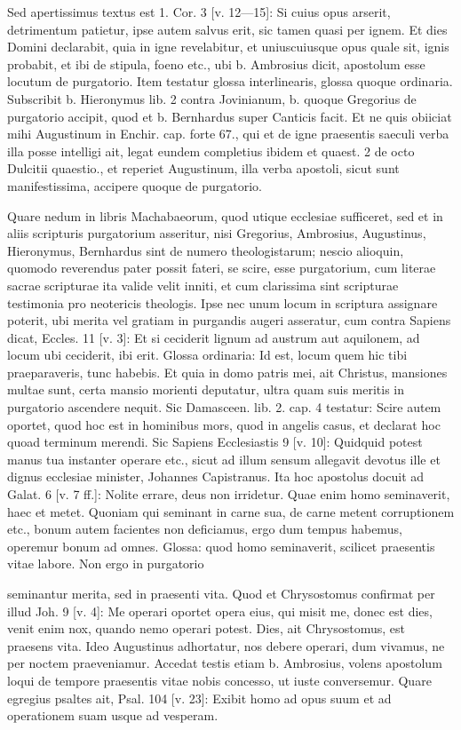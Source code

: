 Sed apertissimus textus est 1. Cor. 3 [v. 12—15]: Si cuius opus arserit, detrimentum patietur, ipse autem salvus erit, sic tamen quasi per ignem. Et dies Domini declarabit, quia in igne revelabitur, et uniuscuiusque opus quale sit, ignis probabit, et ibi de stipula, foeno etc., ubi b. Ambrosius dicit, apostolum esse locutum de purgatorio. Item testatur glossa interlinearis, glossa quoque ordinaria. Subscribit b. Hieronymus lib. 2 contra Jovinianum, b. quoque Gregorius de purgatorio accipit, quod et b. Bernhardus super Canticis facit. Et ne quis obiiciat mihi Augustinum in Enchir. cap. forte 67., qui et de igne praesentis saeculi verba illa posse intelligi ait, legat eundem completius ibidem et quaest. 2 de octo Dulcitii quaestio., et reperiet Augustinum, illa verba apostoli, sicut sunt manifestissima, accipere quoque de purgatorio.

\marginpar{\small[327]} Quare nedum in libris Machabaeorum, quod utique ecclesiae sufficeret, sed et in aliis scripturis purgatorium asseritur, nisi Gregorius, Ambrosius, Augustinus, Hieronymus, Bernhardus sint de numero theologistarum; nescio alioquin, quomodo reverendus pater possit fateri, se scire, esse purgatorium, cum literae sacrae scripturae ita valide velit inniti, et cum clarissima sint scripturae testimonia pro neotericis theologis. Ipse nec unum locum in scriptura assignare poterit, ubi merita vel gratiam in purgandis augeri asseratur, cum contra Sapiens dicat, Eccles. 11 [v. 3]: Et si ceciderit lignum ad austrum aut aquilonem, ad locum ubi ceciderit, ibi erit. Glossa ordinaria: Id est, locum quem hic tibi praeparaveris, tunc habebis. Et quia in domo patris mei, ait Christus, mansiones multae sunt, certa mansio morienti deputatur, ultra quam suis meritis in purgatorio ascendere nequit. Sic Damasceen. lib. 2. cap. 4 testatur: Scire autem oportet, quod hoc est in hominibus mors, quod in angelis casus, et declarat hoc quoad terminum merendi. Sic Sapiens Ecclesiastis 9 [v. 10]: Quidquid potest manus tua instanter operare etc., sicut ad illum sensum allegavit devotus ille et dignus ecclesiae minister, Johannes Capistranus. Ita hoc apostolus docuit ad Galat. 6 [v. 7 ff.]: Nolite errare, deus non irridetur. Quae enim homo seminaverit, haec et metet. Quoniam qui seminant in carne sua, de carne metent corruptionem etc., bonum autem facientes non deficiamus, ergo dum tempus habemus, operemur bonum ad omnes. Glossa: quod homo seminaverit, scilicet praesentis vitae labore. Non ergo in purgatorio

seminantur merita, sed in praesenti vita. Quod et Chrysostomus confirmat per illud Joh. 9 [v. 4]: Me operari oportet opera eius, qui misit me, donec est dies, venit enim nox, quando nemo operari potest. Dies, ait Chrysostomus, est praesens vita. Ideo Augustinus adhortatur, nos debere operari, dum vivamus, ne per noctem praeveniamur. Accedat testis etiam b. Ambrosius, volens apostolum loqui de tempore praesentis vitae nobis concesso, ut iuste conversemur. Quare egregius psaltes ait, Psal. 104 [v. 23]: Exibit homo ad opus suum et ad operationem suam usque ad vesperam.

